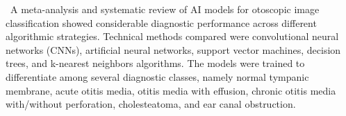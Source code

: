 \begin{thebibliography}{}

~A meta-analysis and systematic review of AI models for otoscopic image classification showed considerable diagnostic performance across different algorithmic strategies. Technical methods compared were convolutional neural networks (CNNs), artificial neural networks, support vector machines, decision trees, and k-nearest neighbors algorithms. The models were trained to differentiate among several diagnostic classes, namely normal tympanic membrane, acute otitis media, otitis media with effusion, chronic otitis media with/without perforation, cholesteatoma, and ear canal obstruction.

\end{thebibliography}
